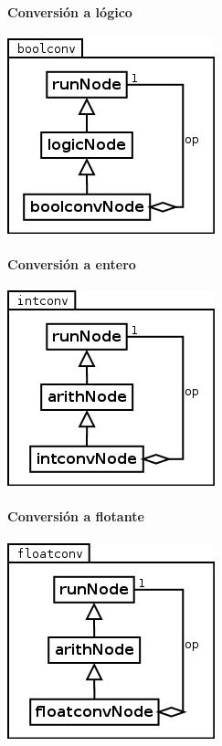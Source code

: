 \paragraph {Conversión a lógico}
\begin{center}
\includegraphics[scale=0.4]{boolconv.png} \\
\end{center}

\paragraph {Conversión a entero}
\begin{center}
\includegraphics[scale=0.4]{intconv.png} \\
\end{center}

\paragraph {Conversión a flotante}
\begin{center}
\includegraphics[scale=0.4]{floatconv.png} \\
\end{center}

